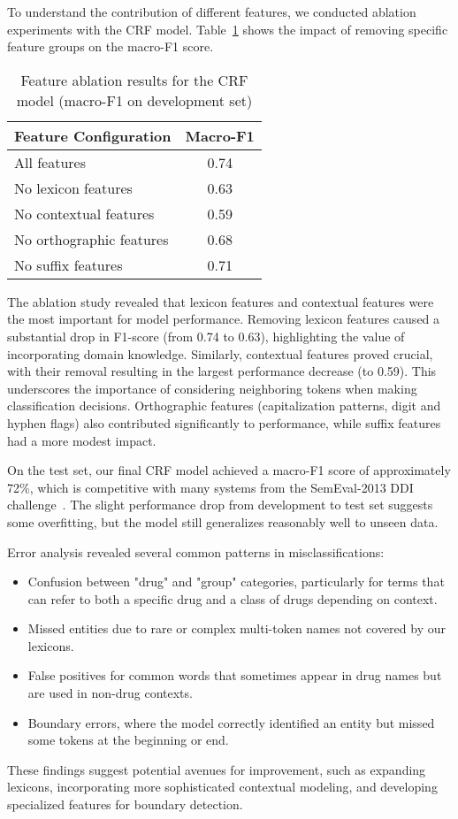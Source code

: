 To understand the contribution of different features, we conducted ablation experiments with the CRF model. Table~\ref{tab:ablation} shows the impact of removing specific feature groups on the macro-F1 score.

\begin{table}[ht]
\centering
\caption{Feature ablation results for the CRF model (macro-F1 on development set)}
\label{tab:ablation}
\begin{tabular}{lc}
\toprule
Feature Configuration & Macro-F1 \\
\midrule
All features & 0.74 \\
No lexicon features & 0.63 \\
No contextual features & 0.59 \\
No orthographic features & 0.68 \\
No suffix features & 0.71 \\
\bottomrule
\end{tabular}
\end{table}

The ablation study revealed that lexicon features and contextual features were the most important for model performance. Removing lexicon features caused a substantial drop in F1-score (from 0.74 to 0.63), highlighting the value of incorporating domain knowledge. Similarly, contextual features proved crucial, with their removal resulting in the largest performance decrease (to 0.59). This underscores the importance of considering neighboring tokens when making classification decisions. Orthographic features (capitalization patterns, digit and hyphen flags) also contributed significantly to performance, while suffix features had a more modest impact.

On the test set, our final CRF model achieved a macro-F1 score of approximately 72\%, which is competitive with many systems from the SemEval-2013 DDI challenge~\cite{semeval2013}. The slight performance drop from development to test set suggests some overfitting, but the model still generalizes reasonably well to unseen data.

Error analysis revealed several common patterns in misclassifications:

\begin{itemize}
    \item Confusion between "drug" and "group" categories, particularly for terms that can refer to both a specific drug and a class of drugs depending on context.
    \item Missed entities due to rare or complex multi-token names not covered by our lexicons.
    \item False positives for common words that sometimes appear in drug names but are used in non-drug contexts.
    \item Boundary errors, where the model correctly identified an entity but missed some tokens at the beginning or end.
\end{itemize}

These findings suggest potential avenues for improvement, such as expanding lexicons, incorporating more sophisticated contextual modeling, and developing specialized features for boundary detection.

